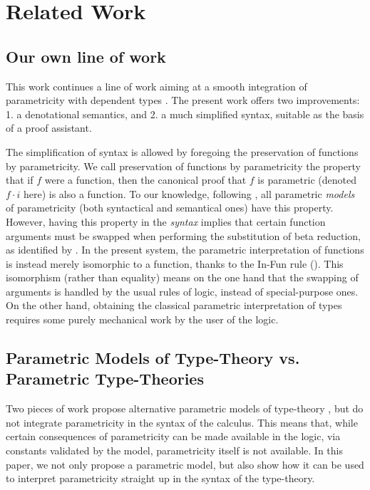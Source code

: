 \documentclass[english]{PaperTools/latex/lipics}
\newcommand\param[1]{\!\cdot\!#1}
\begin{document}
\section{Related Work}

\subsection{Our own line of work}
This work continues a line of work aiming at a smooth integration of
parametricity with dependent types
\citep{bernardy_parametricity_2010,bernardy_realizability_2011,bernardy_proofs_2012,bernardy_computational_2012,bernardy_type-theory_2013}. The present work offers two improvements:
1. a denotational semantics, and
2. a much simplified syntax, suitable as the basis of a proof assistant.

The simplification of syntax is allowed by foregoing the preservation
of functions by parametricity. We call preservation of functions by
parametricity the property that if $f$ were a function, then the
canonical proof that $f$ is parametric (denoted $f \param i$ here) is
also a function. To our knowledge, following \citet{reynolds_types_1983}, all parametric \emph{models} of parametricity (both syntactical and semantical ones) have this property.
However, having this property in the \emph{syntax} implies that
certain function arguments must be swapped when performing the
substitution of beta reduction, as identified by
\citet{bernardy_computational_2012}.  In the present system, the
parametric interpretation of functions is instead merely isomorphic to
a function, thanks to the {\sc In-Fun} rule (). This
isomorphism (rather than equality) means on the one hand that the
swapping of arguments is handled by the usual rules of logic, instead
of special-purpose ones. On the other hand, obtaining the classical
parametric interpretation of types requires some purely mechanical
work by the user of the logic.

\subsection{Parametric Models of Type-Theory vs. Parametric Type-Theories}

Two pieces of work propose alternative parametric models of
type-theory
\citep{atkey_relationally_2014,krishnaswami_internalizing_2013}, but
do not integrate parametricity in the syntax of the calculus. This
means that, while certain consequences of parametricity can be made
available in the logic, via constants validated by the model,
parametricity itself is not available. In this paper, we not only
propose a parametric model, but also show how it can be used to
interpret parametricity straight up in the syntax of the type-theory.
\end{document}
